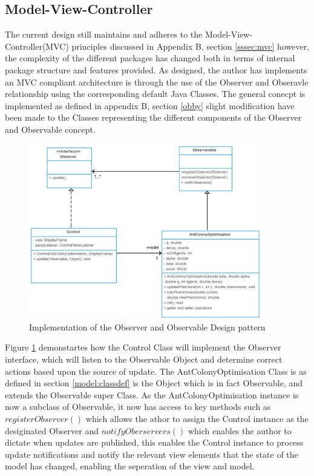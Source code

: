 \subsection{Model-View-Controller}
The current design still maintains and adheres to the Model-View-Controller(MVC) principles discussed in Appendix B, section \ref{sssec:mvc} however, the complexity of the different packages has changed both in terms of internal package structure and features provided. As designed, the author has implements an MVC compliant architecture is through the use of the Observer and Obseravle relationship using the corresponding default Java Classes. The general conecpt is implemented as defined in appendix B, section \ref{obby} slight modification have been made to the Classes representing the different components of the Observer and Observable concept.

\begin{figure}[H]
\centering
\includegraphics[width=0.9\textwidth]{Images/chapter4/observerImplemetation}
\caption{Implementation of the Observer and Observable Design pattern}
\label{fig:observableImp}
\end{figure}

Figure \ref{fig:observableImp} demonstartes how the Control Class will implement the Observer interface, which will listen to the Observable Object and determine correct actions based upon the source of update. The AntColonyOptimisation Class is as defined in section \ref{model:classdef} is the Object which is in fact Observable, and extends the Observable super Class. As the AntColonyOptimisation instance is now a subclass of Observable, it now has access to key methods such as $registerObserver()$ which allows the athor to assign the Control instance as the desiginated Observer and $notifyOberservers()$ which enables the author to dictate when updates are published, this enables the Control instance to process update notifications and notify the relevant view elements that the state of the model has changed, enabling the seperation of the view and model.

